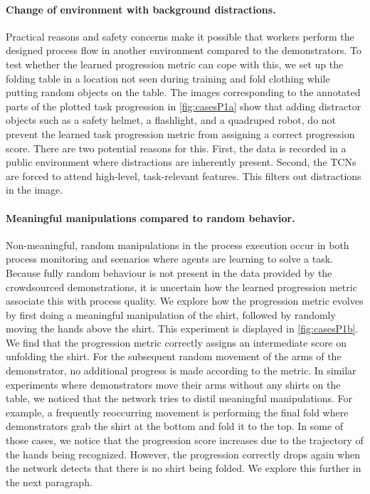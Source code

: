 \documentclass[\home/main.tex]{subfiles}
\begin{document}
\paragraph{Change of environment with background distractions.}
Practical reasons and safety concerns make it possible that workers perform the designed process flow in another environment compared to the demonstrators. To test whether the learned progression metric can cope with this, we set up the folding table in a location not seen during training and fold clothing while putting random objects on the table. The images corresponding to the annotated parts of the plotted task progression in \cref{fig:casesP1a} show that adding distractor objects such as a safety helmet, a flashlight, and a quadruped robot, do not prevent the learned task progression metric from assigning a correct progression score. There are two potential reasons for this. First, the data is recorded in a public environment where distractions are inherently present. Second, the TCNs are forced to attend high-level, task-relevant features. This filters out distractions in the image.

\paragraph{Meaningful manipulations compared to random behavior.}
Non-meaningful, random manipulations in the process execution occur in both process monitoring and scenarios where agents are learning to solve a task. Because fully random behaviour is not present in the data provided by the crowdsourced demonstrations, it is uncertain how the learned progression metric associate this with process quality. We explore how the progression metric evolves by first doing a meaningful manipulation of the shirt, followed by randomly moving the hands above the shirt. This experiment is displayed in \cref{fig:casesP1b}. We find that the progression metric correctly assigns an intermediate score on unfolding the shirt. For the subsequent random movement of the arms of the demonstrator, no additional progress is made according to the metric. In similar experiments where demonstrators move their arms without any shirts on the table, we noticed that the network tries to distil meaningful manipulations. For example, a frequently reoccurring movement is performing the final fold where demonstrators grab the shirt at the bottom and fold it to the top. In some of those cases, we notice that the progression score increases due to the trajectory of the hands being recognized. However, the progression correctly drops again when the network detects that there is no shirt being folded. We explore this further in the next paragraph.
\end{document}
